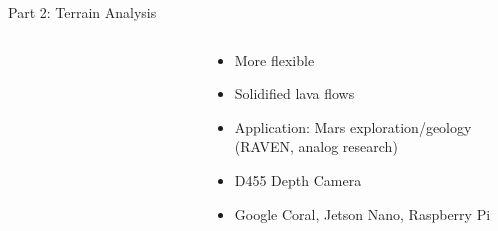 \documentclass[aspectratio=169]{beamer}
\newif\ifpause
\newcommand{\mypause}{\ifpause \pause \fi}
\begin{document}
\begin{frame}{Part 2: Terrain Analysis}
\begin{columns}
\begin{column}{0.37\textwidth}
\begin{figure}[]
\begin{subfigure}[b]{0.9\linewidth}
		    \end{subfigure}
		\end{figure}
        \end{column}
        \begin{column}{0.6\textwidth}
		\begin{itemize}
			\item More flexible
			\mypause
			\item Solidified lava flows
			\mypause
			\item Application: Mars exploration/geology\mypause\\(RAVEN, analog research)
			\mypause
			\item D455 Depth Camera
			\mypause
			\item Google Coral, Jetson Nano, Raspberry Pi
		\end{itemize}
        \end{column}
    \end{columns}
\end{frame}
\end{document}
